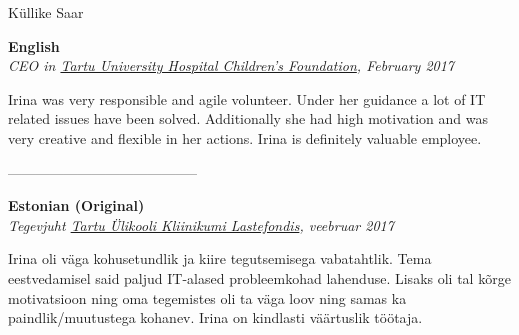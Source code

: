 \documentclass[a4paper, 12pt]{article}
\begin{document}
\newpage

\begin{center}
\LARGE{Küllike Saar}
\end{center}

\begin{center}
\textbf{English}\\
\textit{CEO in \href{https://www.lastefond.ee}{Tartu University Hospital Children's Foundation}, February 2017}
\end{center}

Irina was very responsible and agile volunteer. Under her guidance a lot of IT related issues have been solved. Additionally she had high motivation and was very creative and flexible in her actions. Irina is definitely valuable employee.

\begin{center}
\------------------------------------------
\end{center}

\begin{center}
\textbf{Estonian (Original)}\\
\textit{Tegevjuht \href{https://www.lastefond.ee}{Tartu Ülikooli Kliinikumi Lastefondis}, veebruar 2017}
\end{center}

Irina oli väga kohusetundlik ja kiire tegutsemisega vabatahtlik. Tema eestvedamisel said paljud IT-alased probleemkohad lahenduse. Lisaks oli tal kõrge motivatsioon ning oma tegemistes oli ta väga loov ning samas ka paindlik/muutustega kohanev. Irina on kindlasti väärtuslik töötaja.

\newpage
\end{document}
